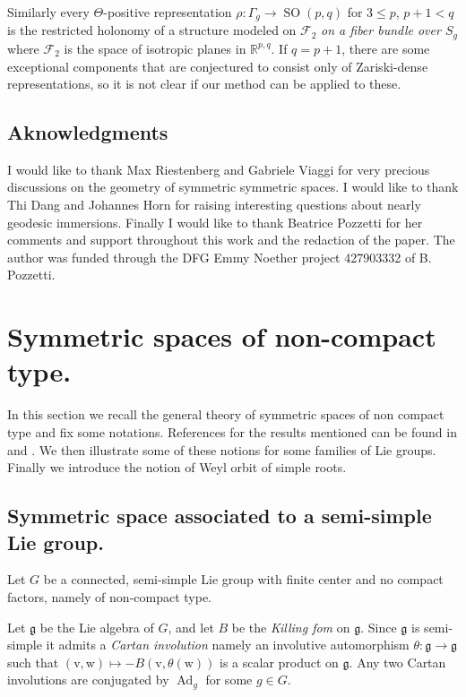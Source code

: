 \documentclass[reqno,10pt]{amsart}
\theoremstyle{plain}
\theoremstyle{definition}
\theoremstyle{remark}
\newcommand{\R}{\mathbb{R}}
\DeclareMathOperator{\SO}{SO}
\DeclareMathOperator{\Ad}{Ad}
\newcommand{\ie}{namely }
\begin{document}
\medskip

Similarly every $\Theta$-positive representation $\rho:\Gamma_g\to\SO(p,q)$ for $3\leq p$, $p+1<q$ is the restricted holonomy of a structure modeled on $\mathcal{F}_2$ \emph{on a fiber bundle over $S_g$} where $\mathcal{F}_2$ is the space of isotropic planes in $\R^{p,q}$. If $q=p+1$, there are some exceptional components that are conjectured to consist only of Zariski-dense representations, so it is not clear if our method can be applied to these.

\subsection*{Aknowledgments}

I would like to thank Max Riestenberg and Gabriele Viaggi for very precious discussions on the geometry of symmetric symmetric spaces.  I would like to thank Thi Dang and Johannes Horn for raising interesting questions about nearly geodesic immersions. Finally I would like to thank Beatrice Pozzetti for her comments and support throughout this work and the redaction of the paper. The author was funded through the DFG Emmy Noether project 427903332 of B. Pozzetti. 

\section{Symmetric spaces of non-compact type.}
\label{sec:symspaces}

In this section we recall the general theory of symmetric spaces of non compact type and fix some notations. References for the results mentioned can be found in \cite{Helgason} and \cite{Eberlein}. We then illustrate some of these notions for some families of Lie groups. Finally we introduce the notion of Weyl orbit of simple roots.

\subsection{Symmetric space associated to a semi-simple Lie group.}

Let $G$ be a connected, semi-simple Lie group with finite center and no compact factors, \ie of non-compact type.


\medskip

Let $\mathfrak{g}$ be the Lie algebra of $G$, and let $B$ be the \emph{Killing fom} on $\mathfrak{g}$. Since $\mathfrak{g}$ is semi-simple it admits a \emph{Cartan involution} \ie an involutive automorphism $\theta:\mathfrak{g}\to \mathfrak{g}$ such that $(\mathrm{v},\mathrm{w})\mapsto-B(\mathrm{v} ,\theta (\mathrm{w}))$ is a scalar product on $\mathfrak{g}$. Any two Cartan involutions are conjugated by $\Ad_g$ for some $g\in G$.
\end{document}
